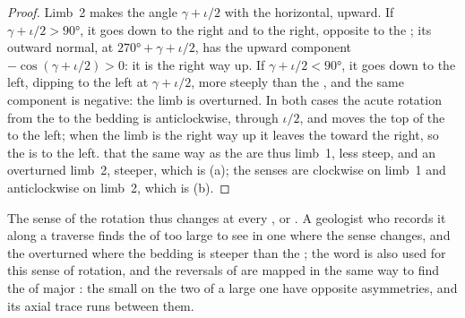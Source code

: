 \begin{proof}
Limb~2 makes the angle $\gamma + \iota/2$ with the horizontal, upward. If
$\gamma + \iota/2 > \ang{90}$, it goes down to the right and  to the
right, opposite to the ; its outward normal, at $\ang{270} + \gamma +
\iota/2$, has the upward component $-\cos(\gamma + \iota/2) > 0$: it is the
right way up. If $\gamma + \iota/2 < \ang{90}$, it goes down to the left,
dipping to the left at $\gamma + \iota/2$, more steeply than the , and
the same component is negative: the limb is overturned. In both cases the acute
rotation from the  to the bedding is anticlockwise, through $\iota/2$,
and moves the top of the  to the left; when the limb is the right way
up it leaves the  toward the right, so the  is to the left. 
that  the same way as the  are thus limb~1, less steep, and an
overturned limb~2, steeper, which is (a); the senses are clockwise on limb~1
and anticlockwise on limb~2, which is (b).
\end{proof}

The sense of the rotation thus changes at every ,  or .
A geologist who records it along a traverse finds the  of  too
large to see in one  where the sense changes, and the overturned 
where the bedding is steeper than the ; the word  is also used
for this sense of rotation, and the reversals of   are
mapped in the same way to find the  of major : the small  on
the two  of a large one have opposite asymmetries, and its axial trace
runs between them.

